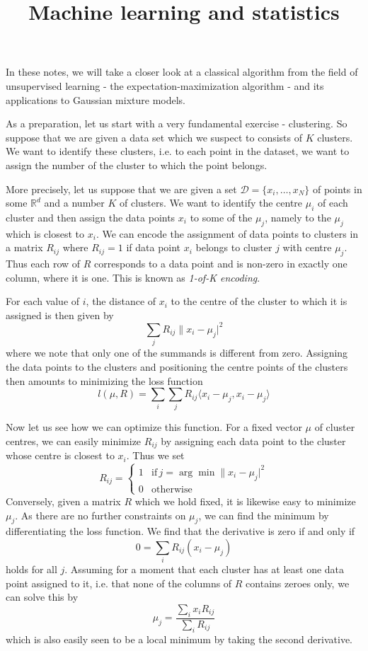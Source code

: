 \documentclass[a4paper, draft]{article}
\title{Machine learning and statistics}
\theoremstyle{own}
\theoremstyle{remark}
\newcommand{\R}{\mathbb{R}}
\begin{document}
\maketitle


In these notes, we will take a closer look at a classical algorithm from the field of unsupervised learning - the expectation-maximization algorithm - and its applications to Gaussian mixture models. 

As a preparation, let us start with a very fundamental exercise - clustering. So suppose that we are given a data set which we suspect to consists of $K$ clusters. We want to identify these clusters, i.e. to each point in the dataset, we want to assign the number of the cluster to which the point belongs. 

More precisely, let us suppose that we are given a set ${\mathcal D} = \{ x_i, \dots, x_N\}$ of points in some $\R^d$ and a number $K$ of clusters. We want to identify the centre $\mu_i$ of each cluster and then assign the data points $x_i$ to some of the $\mu_j$, namely to the $\mu_j$ which is closest to $x_i$. We can encode the assignment of data points to clusters in a matrix $R_{ij}$ where $R_{ij} = 1$ if data point $x_i$ belongs to cluster $j$ with centre $\mu_j$. Thus each row of $R$ corresponds to a data point and is non-zero in exactly one column, where it is one. This is known as {\em 1-of-K encoding}.

For each value of $i$, the distance of $x_i$ to the centre of the cluster to which it is assigned is then given by
$$
\sum_j R_{ij} \| x_i - \mu_j |^2
$$
where we note that only one of the summands is different from zero. Assigning the data points to the clusters and positioning the centre points of the clusters then amounts to minimizing the loss function
$$
l(\mu, R) = \sum_i \sum_j R_{ij} \langle x_i - \mu_j , x_i - \mu_j \rangle
$$

Now let us see how we can optimize this function. For a fixed vector $\mu$ of cluster centres, we can easily minimize $R_{ij}$ by assigning each data point to the cluster whose centre is closest to $x_i$. Thus we set
$$
R_{ij} = 
\begin{cases}
1 & \text{if} \, j = \arg \min \| x_i - \mu_j |^2 \\
0 & \text{otherwise}
\end{cases}
$$
Conversely, given a matrix $R$ which we hold fixed, it is likewise easy to minimize $\mu_j$. As there are no further constraints on $\mu_j$, we can find the minimum by differentiating the loss function. We find that the derivative is zero if and only if
$$
0 = \sum_i R_{ij}(x_i - \mu_j)
$$
holds for all $j$. Assuming for a moment that each cluster has at least one data point assigned to it, i.e. that none of the columns of $R$ contains zeroes only, we can solve this by
$$
\mu_j = \frac{\sum_i x_i R_{ij}}{\sum_i R_{ij}}
$$
which is also easily seen to be a local minimum by taking the second derivative.
\end{document}
